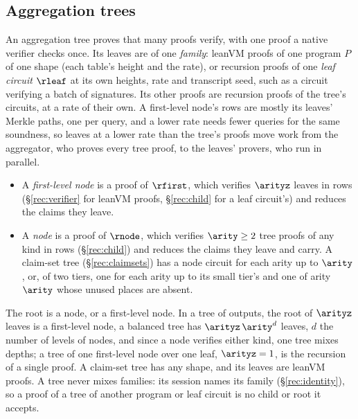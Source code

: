 \subsection{Aggregation trees}\label{rec:tree}

An aggregation tree proves that many proofs verify, with one proof a native verifier checks once. Its leaves are of one \emph{family}: leanVM proofs of one program $P$ of one shape (each table's height and the rate), or recursion proofs of one \emph{leaf circuit} $\rleaf$ at its own heights, rate and transcript seed, such as a circuit verifying a batch of signatures. Its other proofs are recursion proofs of the tree's circuits, at a rate of their own. A first-level node's rows are mostly its leaves' Merkle paths, one per query, and a lower rate needs fewer queries for the same soundness, so leaves at a lower rate than the tree's proofs move work from the aggregator, who proves every tree proof, to the leaves' provers, who run in parallel.
\begin{itemize}[itemsep=1pt,topsep=3pt]
\item A \emph{first-level node} is a proof of $\rfirst$, which verifies $\arityz$ leaves in rows (\S\ref{rec:verifier} for leanVM proofs, \S\ref{rec:child} for a leaf circuit's) and reduces the claims they leave.
\item A \emph{node} is a proof of $\rnode$, which verifies $\arity\ge2$ tree proofs of any kind in rows (\S\ref{rec:child}) and reduces the claims they leave and carry. A claim-set tree (\S\ref{rec:claimsets}) has a node circuit for each arity up to $\arity$, or, of two tiers, one for each arity up to its small tier's and one of arity $\arity$ whose unused places are absent.
\end{itemize}
The root is a node, or a first-level node. In a tree of outputs, the root of $\arityz$ leaves is a first-level node, a balanced tree has $\arityz\,\arity^d$ leaves, $d$ the number of levels of nodes, and since a node verifies either kind, one tree mixes depths; a tree of one first-level node over one leaf, $\arityz=1$, is the recursion of a single proof. A claim-set tree has any shape, and its leaves are leanVM proofs. A tree never mixes families: its session names its family (\S\ref{rec:identity}), so a proof of a tree of another program or leaf circuit is no child or root it accepts.

